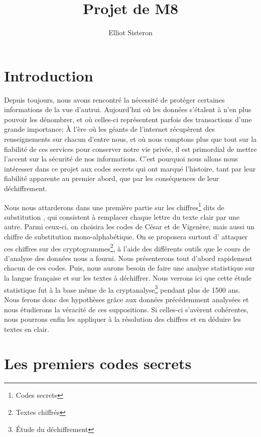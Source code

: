 \documentclass[a4paper, titlepage]{livret}
\title{Projet de M8}		%
\date{}
\author{Elliot Sisteron}	%
\begin{document}
 
\maketitle{}	%

\setcounter{tocdepth}{1}
\tableofcontents		%

\chapter*{Introduction}
Depuis toujours, nous avons rencontré la nécessité de protéger certaines informations de la vue d'autrui.
Aujourd'hui où les données s'étalent à n'en plus pouvoir les dénombrer, et où celles-ci représentent parfois des transactions d'une grande importance; 
À l'ère où les géants de l'internet récupèrent des renseignements sur chacun d'entre nous, et où nous comptons plus que tout sur la fiabilité de ces services pour conserver notre vie privée,  il est primordial de mettre l'accent sur la sécurité de nos informations.
C'est pourquoi nous allons nous intéresser dans ce projet aux codes secrets qui ont marqué l'histoire, tant par leur fiabilité apparente au premier abord, que par les conséquences de leur déchiffrement.

Nous nous attarderons dans une première partie sur les chiffres\footnote{Codes secrets} dits de \og substitution \fg{}, qui consistent à remplacer chaque lettre du texte clair par une autre.
Parmi ceux-ci, on choisira les codes de César et de Vigenère, mais aussi un chiffre de substitution mono-alphabétique.
On se proposera surtout d' \og attaquer \fg{} ces chiffres sur des cryptogrammes\footnote{Textes chiffrés}, à l'aide des différents outils que le cours de d'analyse des données nous a fourni.
Nous présenterons tout d'abord rapidement chacun de ces codes.
Puis, nous aurons besoin de faire une analyse statistique sur la langue française et sur les textes à déchiffrer.
Nous verrons ici que cette étude statistique fut à la base même de la cryptanalyse\footnote{Étude du déchiffrement} pendant plus de 1500 ans. 
Nous ferons donc des hypothèses grâce aux données précédemment analysées et nous étudierons la véracité de ces suppositions. 
Si celles-ci s'avèrent cohérentes, nous pourrons enfin les appliquer à la résolution des chiffres et en déduire les textes en clair.

\chapter{Les premiers codes secrets}
\end{document}
